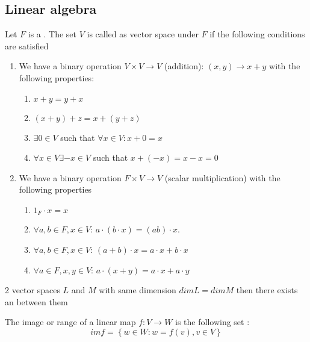 \begin{appendices}
\subsection{Linear algebra}

\begin{definition}
  Let $F$ is a . The set $V$ is called as vector
  space under $F$ if the following conditions are satisfied
  \begin{enumerate}
  \item We have a binary operation $V \times V \rightarrow V$
    (addition): $(x,y) \rightarrow x + y$ with the following
    properties:
    \begin{enumerate}
    \item $x + y = y + x$
    \item $(x + y) + z = x + ( y + z )$
    \item $\exists 0 \in V$ such that $\forall x \in V: x + 0 = x$
    \item $\forall x \in V \exists -x \in V$ such that $x + (-x) = x -
      x = 0$ 
    \end{enumerate}    
  \item We have a binary operation $F \times V \rightarrow V$ (scalar
    multiplication) with the following properties
    \begin{enumerate}
    \item $1_F \cdot x = x$
    \item $\forall a,b \in F, x \in V$: $a\cdot\left(b \cdot x\right)
      = \left(a b\right) \cdot x$.
    \item $\forall a,b \in F, x \in V$:
      $(a+b)\cdot x = a \cdot x + b \cdot x$
    \item $\forall a \in F, x, y \in V$:
      $a\cdot(x+y) = a\cdot x + a \cdot y$
    \end{enumerate}        
  \end{enumerate}
  \label{def:vectorspace}
\end{definition}

\begin{lemma}
  2 vector spaces $L$ and $M$ with same dimension $dim L = dim M$ then
  there exists an  between them
  \label{lem:vsisomorphism}
\end{lemma}

\begin{definition}[Image]
  The image or range of a linear map $f: V \to W$ is the following
  set \cite{wiki:linearmap}:
  \[
  im f = \left\{
  w \in W: w = f(v), v \in V
  \right\}
  \]
  \label{def:image}
\end{definition}


\end{appendices}
